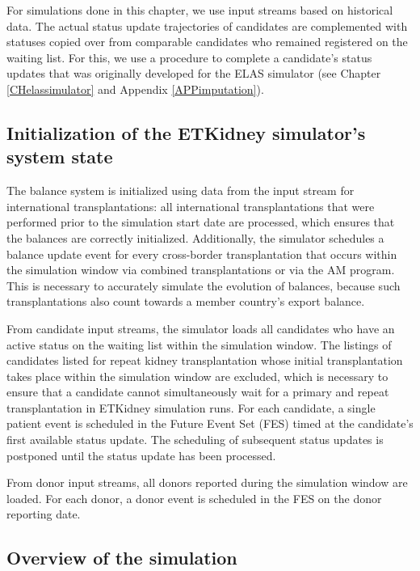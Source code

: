 \documentclass[11pt,twoside,]{book}
\begin{document}
For simulations done in this chapter, we use input streams based on
historical data. The actual status update trajectories of candidates are complemented
with statuses copied over from comparable candidates who remained registered
on the waiting list. For this, we use a procedure to complete a candidate's
status updates that was originally developed for the ELAS simulator (see Chapter \ref{CHelassimulator} and Appendix \ref{APPimputation}).

\subsection{Initialization of the ETKidney simulator's system state}\label{sec:etkidneyinit}

The balance system is initialized using data from the input stream for international transplantations:
all international transplantations that were performed prior to the simulation
start date are processed, which ensures that the balances are correctly initialized.
Additionally, the
simulator schedules a balance update event for every cross-border transplantation
that occurs within the simulation window via combined transplantations or via the AM
program. This is necessary to accurately simulate the evolution of balances,
because such transplantations also count towards a member country's export balance.

From candidate input streams, the simulator loads all candidates who
have an active status on the waiting list within the simulation window.
The listings of candidates listed for repeat kidney transplantation whose initial
transplantation takes place within the simulation window are excluded, which
is necessary to ensure that a candidate cannot simultaneously wait for a
primary and repeat transplantation in ETKidney simulation runs. For each candidate,
a single patient event is scheduled in the Future Event Set (FES) timed at the
candidate's first available status update. The scheduling of subsequent status
updates is postponed until the status update has been processed.

From donor input streams, all donors reported during the simulation
window are loaded. For each donor, a donor event is scheduled in the FES
on the donor reporting date.

\newpage

\subsection{Overview of the simulation}\label{sec:etkidneyoverview}
\end{document}

